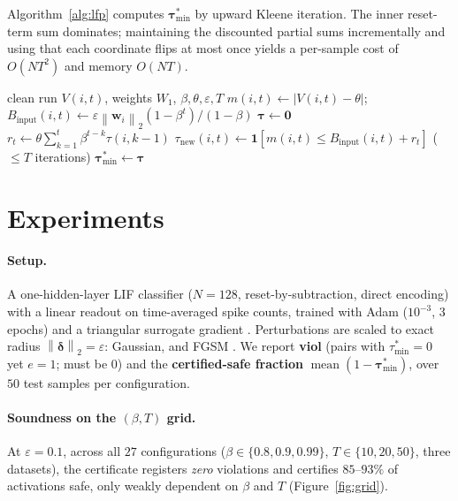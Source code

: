 \documentclass[10pt,twocolumn]{article}
\newcommand{\norm}[1]{\left\lVert #1 \right\rVert}
\newcommand{\abs}[1]{\left\lvert #1 \right\rvert}
\newcommand{\ind}{\mathbf{1}}
\newcommand{\eps}{\varepsilon}
\newcommand{\Bin}{B_{\mathrm{input}}}
\begin{document}
Algorithm~\ref{alg:lfp} computes $\bm{\tau}^{*}_{\min}$ by upward Kleene iteration. The inner
reset-term sum dominates; maintaining the discounted partial sums incrementally and using that
each coordinate flips at most once yields a per-sample cost of $O(NT^2)$ and memory $O(NT)$.

\begin{algorithm}[t]
\caption{Least Fixed-Point Spike-Preservation Certificate}
\label{alg:lfp}
\begin{algorithmic}[1]
\Require clean run $V(i,t)$, weights $W_1$, $\beta,\theta,\eps,T$
\State $m(i,t)\gets\abs{V(i,t)-\theta}$;\quad
       $\Bin(i,t)\gets\eps\norm{\bm{w}_i}_2(1-\beta^t)/(1-\beta)$
\State $\bm{\tau}\gets\bm{0}$
\Repeat
    \State $r_t\gets\theta\sum_{k=1}^{t}\beta^{t-k}\tau(i,k{-}1)$
    \State $\tau_{\mathrm{new}}(i,t)\gets\ind[m(i,t)\le \Bin(i,t)+r_t]$
  \EndFor
{}\quad($\le T$ iterations)
\State \Return $\bm{\tau}^{*}_{\min}\gets\bm{\tau}$
\end{algorithmic}
\end{algorithm}

\section{Experiments}
\label{sec:exp}

\paragraph{Setup.} A one-hidden-layer LIF classifier ($N{=}128$, reset-by-subtraction, direct
encoding) with a linear readout on time-averaged spike counts, trained with Adam
($10^{-3}$, $3$ epochs) and a triangular surrogate gradient
\citep{neftci2019surrogate,wu2018spatio}. Perturbations are scaled to exact radius
$\norm{\bm{\delta}}_2=\eps$: Gaussian, and FGSM \citep{goodfellow2015explaining}. We report
\textbf{viol} (pairs with $\tau^{*}_{\min}{=}0$ yet $e{=}1$; must be $0$) and the
\textbf{certified-safe fraction} $\operatorname{mean}(1-\bm{\tau}^{*}_{\min})$, over $50$ test
samples per configuration.

\paragraph{Soundness on the $(\beta,T)$ grid.} At $\eps{=}0.1$, across all $27$ configurations
($\beta\in\{0.8,0.9,0.99\}$, $T\in\{10,20,50\}$, three datasets), the certificate registers
\emph{zero} violations and certifies $85$--$93\%$ of activations safe, only weakly dependent on
$\beta$ and $T$ (Figure~\ref{fig:grid}).
\end{document}
